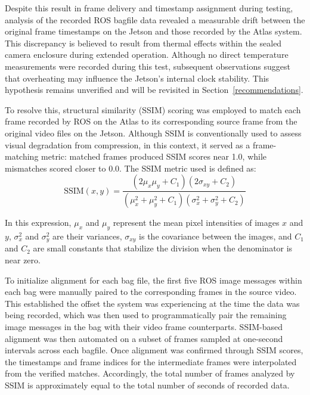 \documentclass[../main.tex]{subfiles}
\begin{document}
Despite this result in frame delivery and timestamp assignment during testing, analysis of the recorded ROS bagfile data revealed a measurable drift between the original frame timestamps on the Jetson and those recorded by the Atlas system. 
This discrepancy is believed to result from thermal effects within the sealed camera enclosure during extended operation. 
Although no direct temperature measurements were recorded during this test, subsequent observations suggest that overheating may influence the Jetson's internal clock stability. 
This hypothesis remains unverified and will be revisited in Section~\ref{recommendations}.

To resolve this, structural similarity (SSIM) scoring was employed to match each frame recorded by ROS on the Atlas to its corresponding source frame from the original video files on the Jetson. 
Although SSIM is conventionally used to assess visual degradation from compression, in this context, it served as a frame-matching metric: matched frames produced SSIM scores near 1.0, while mismatches scored closer to 0.0. The SSIM metric used is defined as:
\begin{equation}
    \text{SSIM}(x, y) = \frac{(2\mu_x\mu_y + C_1)(2\sigma_{xy} + C_2)}{(\mu_x^2 + \mu_y^2 + C_1)(\sigma_x^2 + \sigma_y^2 + C_2)}
\end{equation}

In this expression, $\mu_x$ and $\mu_y$ represent the mean pixel intensities of images $x$ and $y$, $\sigma_x^2$ and $\sigma_y^2$ are their variances, $\sigma_{xy}$ is the covariance between the images, and $C_1$ and $C_2$ are small constants that stabilize the division when the denominator is near zero.

To initialize alignment for each bag file, the first five ROS image messages within each bag were manually paired to the corresponding frames in the source video.
This established the offset the system was experiencing at the time the data was being recorded, which was then used to programmatically pair the remaining image messages in the bag with their video frame counterparts.
SSIM-based alignment was then automated on a subset of frames sampled at one-second intervals across each bagfile. 
Once alignment was confirmed through SSIM scores, the timestamps and frame indices for the intermediate frames were interpolated from the verified matches. 
Accordingly, the total number of frames analyzed by SSIM is approximately equal to the total number of seconds of recorded data.
\end{document}
